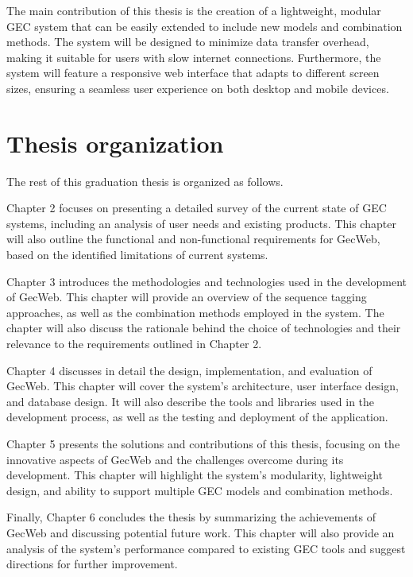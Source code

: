 The main contribution of this thesis is the creation of a lightweight, modular GEC system that can be easily extended to include new models and combination methods.
The system will be designed to minimize data transfer overhead, making it suitable for users with slow internet connections.
Furthermore, the system will feature a responsive web interface that adapts to different screen sizes, ensuring a seamless user experience on both desktop and mobile devices.

\section{Thesis organization}
\label{section:organization}

The rest of this graduation thesis is organized as follows.

Chapter 2 focuses on presenting a detailed survey of the current state of GEC systems, including an analysis of user needs and existing products.
This chapter will also outline the functional and non-functional requirements for GecWeb, based on the identified limitations of current systems.

Chapter 3 introduces the methodologies and technologies used in the development of GecWeb.
This chapter will provide an overview of the sequence tagging approaches, as well as the combination methods employed in the system.
The chapter will also discuss the rationale behind the choice of technologies and their relevance to the requirements outlined in Chapter 2.

Chapter 4 discusses in detail the design, implementation, and evaluation of GecWeb.
This chapter will cover the system's architecture, user interface design, and database design.
It will also describe the tools and libraries used in the development process, as well as the testing and deployment of the application.

Chapter 5 presents the solutions and contributions of this thesis, focusing on the innovative aspects of GecWeb and the challenges overcome during its development.
This chapter will highlight the system's modularity, lightweight design, and ability to support multiple GEC models and combination methods.

Finally, Chapter 6 concludes the thesis by summarizing the achievements of GecWeb and discussing potential future work.
This chapter will also provide an analysis of the system's performance compared to existing GEC tools and suggest directions for further improvement.
